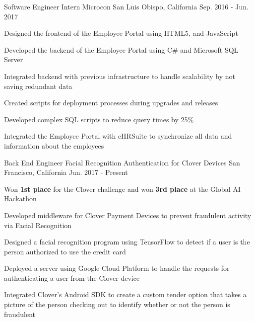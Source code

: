 \begin{cventries}

\cventry
{Software Engineer Intern} %
{Microcon} %
{San Luis Obispo, California} %
{Sep. 2016 - Jun. 2017} %
{ %
\begin{cvitems}
\item {Designed the frontend of the Employee Portal using HTML5, and JavaScript}
\item {Developed the backend of the Employee Portal using C\# and Microsoft SQL Server}
\item {Integrated backend with previous infrastructure to handle scalability by not saving redundant data}
\item {Created scripts for deployment processes during upgrades and releases}
\item {Developed complex SQL scripts to reduce query times by 25\%}
\item {Integrated the Employee Portal with eHRSuite to synchronize all data and information about the employees}
\end{cvitems}
}



\cventry
{Back End Engineer} %
{Facial Recognition Authentication for Clover Devices} %
{San Francisco, California} %
{Jun. 2017 - Present} %
{ %
\begin{cvitems}
\item {Won \textbf{1st place} for the Clover challenge and won \textbf{3rd place} at the Global AI Hackathon}
\item {Developed middleware for Clover Payment Devices to prevent fraudulent activity via Facial Recognition}
\item {Designed a facial recognition program using TensorFlow to detect if a user is the person authorized to use the credit card}
\item {Deployed a server using Google Cloud Platform to handle the requests for authenticating a user from the Clover device}
\item {Integrated Clover's Android SDK to create a custom tender option that takes a picture of the person checking out to identify whether or not the person is fraudulent}
\end{cvitems}
}


\end{cventries}
